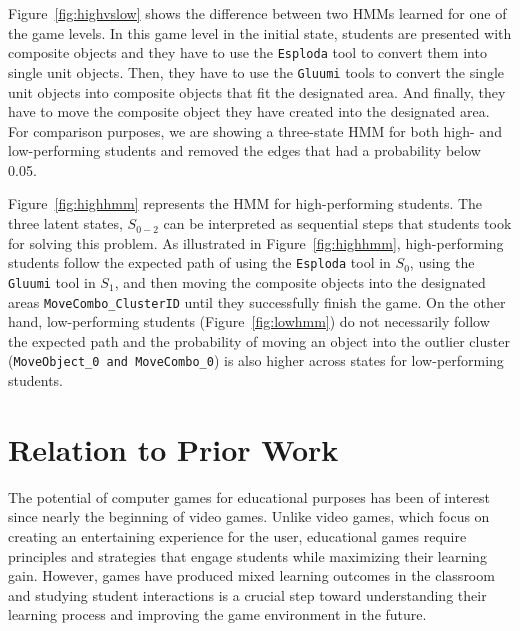 \documentclass{sigchi}
\begin{document}
	Figure~\ref{fig:highvslow} shows the difference between two HMMs learned for one of the game levels.
	In this game level in the initial state, students are presented with composite objects and they have to use the \texttt{Esploda} tool to convert them into single unit objects. 
	Then, they have to use the \texttt{Gluumi} tools to convert the single unit objects into composite objects that fit the designated area. 
	And finally, they have to move the composite object they have created into the designated area.
	For comparison purposes, we are showing a three-state HMM for both high- and low-performing students and removed the edges that had a probability below 0.05.
	
	Figure~\ref{fig:highhmm} represents the HMM for high-performing students. 
	The three latent states, $S_{0-2}$ can be interpreted as sequential steps that students took for solving this problem. As illustrated in Figure~\ref{fig:highhmm}, high-performing students follow the expected path of using the \texttt{Esploda} tool in $S_0$, using the \texttt{Gluumi} tool in $S_1$, and then moving the composite objects into the designated areas \texttt{MoveCombo\_{ClusterID}} until they successfully finish the game.
	On the other hand, low-performing students (Figure~\ref{fig:lowhmm}) do not necessarily follow the expected path and the probability of moving an object into the outlier cluster (\texttt{MoveObject\_0 and MoveCombo\_0}) is also higher across states for low-performing students.
	
	\section{Relation to Prior Work}
	\label{sec:priorwork}
	The potential of computer games for educational purposes has been of interest since nearly the beginning of video games. 
	Unlike video games, which focus on creating an entertaining experience for the user, educational games require principles and strategies that engage students while maximizing their learning gain. 
	However, games have produced mixed learning outcomes in the classroom \cite{harpstead2013search,mayo2009video} and studying student interactions is a crucial step toward understanding their learning process and improving the game environment in the future.
	
\end{document}
